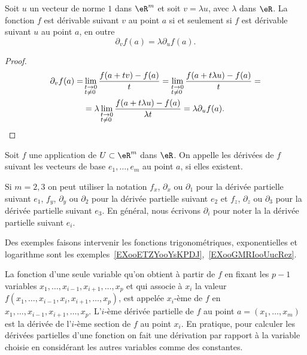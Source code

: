 \begin{proposition}
Soit $u$ un vecteur de norme $1$ dans $\eR^m$ et soit $v=\lambda u$, avec $\lambda$ dans $\eR$. La fonction $f$ est dérivable suivant $v$ au point $a$ si et seulement si $f$ est dérivable suivant $u$ au point $a$, en outre
\[
\partial_v f(a)=\lambda\partial_u f(a).
\]
\end{proposition}
\begin{proof}
  \begin{equation}
    \begin{aligned}
  \partial_v f(a)=&\lim_{\begin{subarray}{l}
     t\to 0\\ t\neq 0
    \end{subarray}}\frac{f(a+tv)-f(a)}{t}=\lim_{\begin{subarray}{l}
     t\to 0\\ t\neq 0
    \end{subarray}}\frac{f(a+t\lambda u)-f(a)}{t}=\\
&=\lambda \lim_{\begin{subarray}{l}
    t\to 0\\ t\neq 0
  \end{subarray}}\frac{f(a+t\lambda u)-f(a)}{\lambda t}=\lambda \partial_u f(a).
    \end{aligned}
  \end{equation}
\end{proof}
\begin{definition}
Soit $f$ une application de $U\subset\eR^m$ dans $\eR$. On appelle  les dérivées de $f$ suivant les vecteurs de base $e_1,\ldots,e_m $ au point $a$, si elles existent.
\end{definition}
Si $m=2,3$ on peut utiliser la notation $f_x$, $\partial_x$  ou $\partial_1$ pour la dérivée partielle suivant $e_1$, $f_y$, $\partial_y$  ou $\partial_2$  pour la dérivée partielle suivant $e_2$ et $f_z$,  $\partial_z$  ou $\partial_3$  pour la dérivée partielle suivant $e_3$. En général, nous écrivons $\partial_i$ pour noter la la dérivée partielle suivant $e_i$.

Des exemples faisons intervenir les fonctions trigonométriques, exponentielles et logarithme sont les exemples~\ref{EXooETZYooYsKPDJ},~\ref{EXooGMRIooUucRez}.

La fonction d'une seule variable qu'on obtient à partir de $f$ en fixant les $p-1$ variables  $x_1,\ldots, x_{i-1}, x_{i+1}, \ldots, x_p$ et qui associe à $x_i$ la valeur $f(x_1,\ldots, x_{i-1}, x_i, x_{i+1}, \ldots, x_p)$, est appelée $x_i$-ème  de $f$ en $x_1,\ldots, x_{i-1}, x_{i+1}, \ldots, x_p$. L'$i$-ème dérivée partielle de $f$ au point $a=(x_1,\ldots,x_m)$ est la dérivée de l'$i$-ème section de $f$ au point $x_i$. En pratique, pour calculer les dérivées partielles d'une fonction on fait une dérivation par rapport à la variable choisie en considérant les  autres variables comme des constantes.

